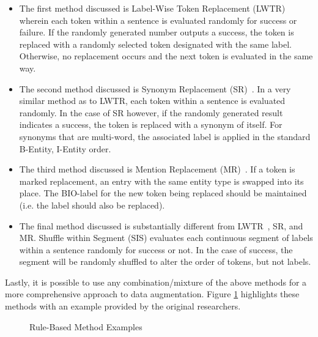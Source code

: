 \documentclass[12pt]{report}
\begin{document}
        \begin{itemize}
            \item The first method discussed is Label-Wise Token Replacement (LWTR)~\cite{Rules} wherein each token within a sentence is evaluated randomly for success or failure. If the randomly generated number outputs a success, the token is replaced with a randomly selected token designated with the same label. Otherwise, no replacement occurs and the next token is evaluated in the same way.
            
            \item The second method discussed is Synonym Replacement (SR)~\cite{Rules}. In a very similar method as to LWTR, each token within a sentence is evaluated randomly. In the case of SR however, if the randomly generated result indicates a success, the token is replaced with a synonym of itself. For synonyms that are multi-word, the associated label is applied in the standard B-Entity, I-Entity order.
            
            \item The third method discussed is Mention Replacement (MR)~\cite{Rules}. If a token is marked replacement, an entry with the same entity type is swapped into its place. The BIO-label for the new token being replaced should be maintained (i.e. the label should also be replaced).
            
            \item The final method discussed is substantially different from LWTR~\cite{Rules}, SR, and MR. Shuffle within Segment (SIS) evaluates each continuous segment of labels within a sentence randomly for success or not. In the case of success, the segment will be randomly shuffled to alter the order of tokens, but not labels.
        \end{itemize}
        
        Lastly, it is possible to use any combination/mixture of the above methods for a more comprehensive approach to data augmentation. Figure \ref{fig:rule_based_img} highlights these methods with an example provided by the original researchers.
        
        \begin{figure}[H]
            \centering
            \caption{Rule-Based Method Examples~\cite{Rules}}
            \label{fig:rule_based_img} 
        \end{figure}
        
\end{document}
